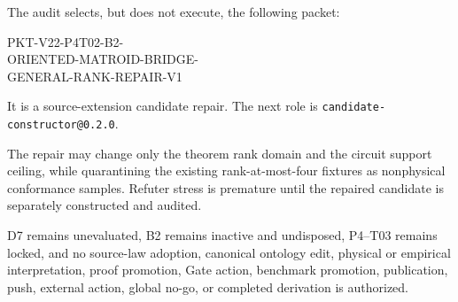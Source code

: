 \documentclass[11pt]{article}
\begin{document}
The audit selects, but does not execute, the following packet:
\begin{flushleft}
\small\ttfamily
PKT-V22-P4T02-B2-\\
ORIENTED-MATROID-BRIDGE-\\
GENERAL-RANK-REPAIR-V1
\end{flushleft}
It is a source-extension candidate repair.  The next role is
\texttt{candidate-constructor@0.2.0}.

The repair may change only the theorem rank
domain and the circuit support ceiling, while quarantining the existing
rank-at-most-four fixtures as nonphysical conformance samples.  Refuter stress
is premature until the repaired candidate is separately constructed and
audited.

D7 remains unevaluated, B2 remains inactive and undisposed, P4--T03 remains
locked, and no source-law adoption, canonical ontology edit, physical or
empirical interpretation, proof promotion, Gate action, benchmark promotion,
publication, push, external action, global no-go, or completed derivation is
authorized.
\end{document}
